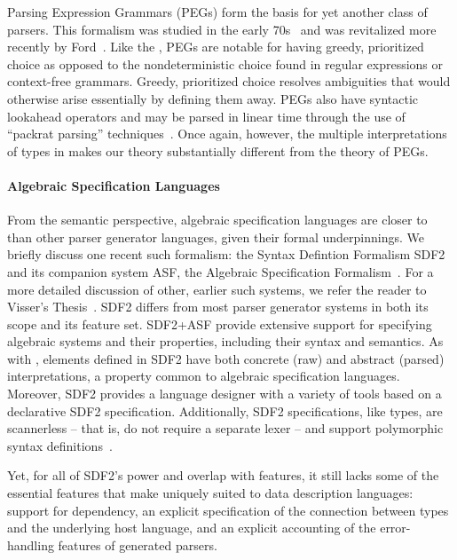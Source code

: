 Parsing Expression Grammars (PEGs) form the basis for yet another
class of parsers. This formalism was studied in the early
70s~\cite{birman+:parsing} and was revitalized more recently by
Ford~\cite{ford:pegs}.  Like the \ddc{}, PEGs are notable for
having greedy, prioritized 
choice as opposed to the nondeterministic choice found in regular
expressions or context-free grammars.  Greedy, prioritized choice
resolves ambiguities that would otherwise arise essentially
by defining them away.  PEGs also have syntactic lookahead
operators and may be parsed in linear time through the use of
``packrat parsing'' techniques~\cite{ford:packrat,grimm:packrat}.
Once again, however, the multiple interpretations of types in \ddc{} makes our
theory substantially different from the theory of PEGs.

\paragraph*{Algebraic Specification Languages}
From the semantic perspective, algebraic specification languages are closer to \ddc{} than other parser generator languages, given their formal underpinnings. We briefly discuss one recent such formalism: the Syntax Defintion Formalism SDF2~\cite{visser:thesis} and its companion system ASF, the Algebraic Specification Formalism~\cite{asfchapter}. For a more detailed discussion of other, earlier such systems, we refer the reader to Visser's Thesis~\cite{visser:thesis}. SDF2 differs from most parser generator systems in both its scope and its feature set. SDF2+ASF provide extensive support for specifying algebraic systems and their properties, including their syntax and semantics. As with \ddc{}, elements defined in SDF2 have both concrete (raw) and abstract (parsed) interpretations, a property common to algebraic specification languages. Moreover, SDF2 provides a language designer with a variety of tools based on a declarative SDF2 specification. Additionally, SDF2 specifications, like \ddc{} types, are scannerless -- that is, do not require a separate lexer -- and support polymorphic syntax definitions~\cite{Vis98.psd}.

Yet, for all of SDF2's power and overlap with \ddc{} features, it still lacks some of the essential features that make \ddc{} uniquely suited to data description languages: support for dependency, an explicit specification of the connection between \ddc{} types and the underlying host language, and an explicit accounting of the error-handling features of generated parsers.

